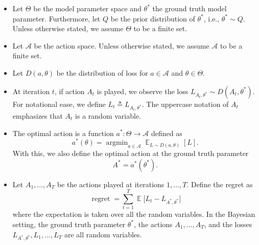 \documentclass[11pt]{article}
\DeclareMathOperator*{\argmin}{argmin}
\DeclareMathOperator*{\E}{\mathbb{E}}
\DeclareMathOperator{\reg}{regret}
\begin{document}
\begin{itemize}
    \item Let $\Theta$ be the model parameter space and $\theta^*$ the ground truth model parameter. Furthermore, let $Q$ be the prior distribution of $\theta^*$, i.e., $\theta^* \sim Q$. Unless otherwise stated, we assume $\Theta$ to be a finite set.
    
    \item Let $\mathcal{A}$ be the action space. Unless otherwise stated, we assume $\mathcal{A}$ to be a finite set.
    
    \item Let $D(a, \theta)$ be the distribution of loss for $a \in \mathcal{A}$ and $\theta \in \Theta$.
    
    \item At iteration $t$, if action $A_t$ is played, we observe the loss $L_{A_t, \theta^*} \sim D(A_t, \theta^*)$. For notational ease, we define $L_t \triangleq L_{A_t, \theta^*}$. The uppercase notation of $A_t$ emphasizes that $A_t$ is a random variable.
    
    \item The optimal action is a function $a^*: \Theta \rightarrow \mathcal{A}$ defined as
    \begin{equation*}
        a^*(\theta) = \argmin_{a \in \mathcal{A}} \E_{L \sim D(a, \theta)}[L].
    \end{equation*}
    With this, we also define the optimal action at the ground truth parameter
    \begin{equation*}
        A^* = a^*(\theta^*).
    \end{equation*}
    
    \item Let $A_1, ..., A_T$ be the actions played at iterations $1, ..., T$. Define the regret as
    \begin{equation*}
        \reg  = \sum_{t=1}^T \E \Big[L_t - L_{A^*, \theta^*}\Big]
    \end{equation*}
    where the expectation is taken over all the random variables. In the Bayesian setting, the ground truth parameter $\theta^*$, the actions $A_1, ..., A_T$, and the losses $L_{A^*, \theta^*}, L_1, ..., L_T$ are all random variables.
\end{itemize}
\end{document}

